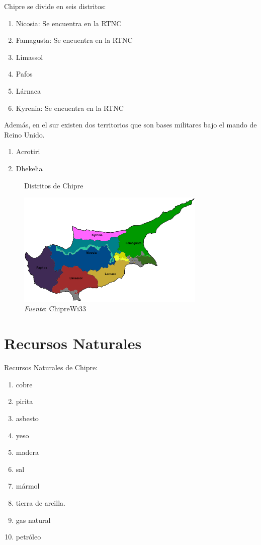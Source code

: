 \documentclass[a4paper,openright,12pt]{book}
\begin{document}
Chipre se divide en seis distritos:

\begin{enumerate}

    \item Nicosia: Se encuentra en la RTNC
    \item Famagusta: Se encuentra en la RTNC
    \item Limassol
    \item Pafos
    \item Lárnaca
    \item Kyrenia: Se encuentra en la RTNC
\end{enumerate}

 Además, en el sur existen dos territorios que son bases militares bajo el mando de Reino Unido.

\begin{enumerate}
    \item Acrotiri
    \item Dhekelia
\end{enumerate}

\begin{figure}[h]
    \caption{Distritos de Chipre}
    \includegraphics[width=9cm]{mapa_distritos.png}
    \caption*{\textit{Fuente}: {ChipreWi33}}
    \label{mapdistrics}
\end{figure}

\section{Recursos Naturales}

Recursos Naturales de Chipre:

\begin{enumerate}

    \item cobre
    \item pirita
    \item asbesto
    \item yeso
    \item madera
    \item sal
    \item mármol
    \item tierra de arcilla.
    \item gas natural
    \item petróleo

\end{enumerate}
\end{document}
